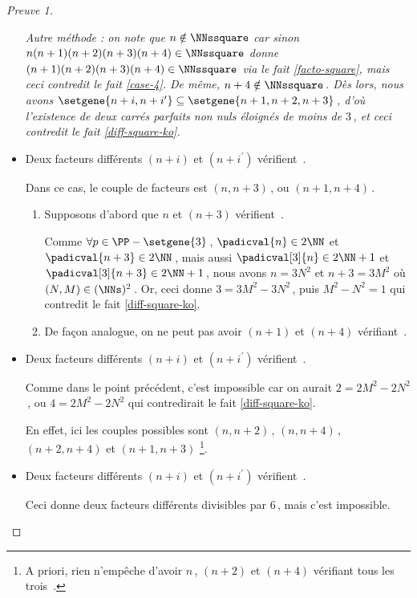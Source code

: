 \begin{proof}[Preuve 1]
\begin{itemize}
		
		\noindent
		\emph{Autre méthode : on note que $n \notin \NNssquare$ car sinon $n(n+1)(n+2)(n+3)(n+4) \in \NNssquare$ donne $(n+1)(n+2)(n+3)(n+4) \in \NNssquare$ via le fait \ref{facto-square}, mais ceci contredit le fait \ref{case-4}.
		De même, $n+4 \notin \NNssquare$\,.
		Dès lors, nous avons $\setgene{n+i, n+i^\prime} \subseteq \setgene{n+1, n+2, n+3}$\,, d'où l'existence de deux carrés parfaits non nuls éloignés de moins de $3$\,, et ceci contredit le fait \ref{diff-square-ko}.}


    	\medskip
		\item Deux facteurs différents $(n+i)$ et $(n+i^\prime)$ vérifient \,.
		
		\smallskip
		\noindent
		Dans ce cas, le couple de facteurs est $(n, n + 3)$\,, ou $(n + 1, n + 4)$\,.    
		\begin{enumerate}
			\item Supposons d'abord que $n$ et $(n+3)$ vérifient \,.
			
			\noindent
			Comme $\forall p \in \PP - \setgene{3}$\,, $\padicval{n} \in 2 \NN$ et $\padicval{n + 3} \in 2 \NN$\,,
			mais aussi $\padicval[3]{n} \in 2 \NN + 1$ et $\padicval[3]{n + 3} \in 2 \NN + 1$\,,
			nous avons $n = 3 N^2$ et $n+3 = 3 M^2$ où $(N, M) \in ( \NNs )^2$\,.
			Or, ceci donne $3 = 3 M^2 - 3 N^2$\,, puis $M^2 - N^2 = 1$ qui contredit le fait \ref{diff-square-ko}.

			\item De façon analogue, on ne peut pas avoir $(n+1)$ et $(n+4)$ vérifiant \,.
		\end{enumerate}


    	\medskip
		\item Deux facteurs différents $(n+i)$ et $(n+i^\prime)$ vérifient \,.
		
		\smallskip
		\noindent
		Comme dans le point précédent, c'est impossible car on aurait $2 = 2 M^2 - 2 N^2$\,, ou $4 = 2 M^2 - 2 N^2$ qui contredirait le fait \ref{diff-square-ko}. 
		
		\smallskip
		
		\noindent
		En effet, ici les couples possibles sont $(n, n + 2)$\,, $(n, n + 4)$\,,  $(n + 2, n + 4)$ et $(n + 1, n + 3)$
		\footnote{
			A priori, rien n'empêche d'avoir $n$\,, $(n + 2)$ et $(n + 4)$ vérifiant tous les trois \,.
		}.


    	\medskip
		\item Deux facteurs différents $(n+i)$ et $(n+i^\prime)$ vérifient \,.
		
		\smallskip
		\noindent
		Ceci donne deux facteurs différents divisibles par $6$\,, mais c'est impossible. \qedhere
    \end{itemize}
\end{proof}


